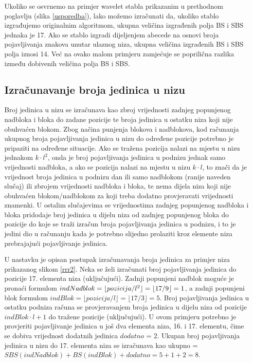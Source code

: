 Ukoliko se osvrnemo na primjer wavelet stabla prikazanim u prethodnom poglavlju (slika \ref{usporedba}), lako možemo izračunati da, ukoliko stablo izgrađujemo originalnim algoritmom, ukupna veličina izgrađenih polja BS i SBS jednaka je 17. Ako se stablo izgradi dijeljenjem abecede na osnovi broja pojavljivanja znakova unutar ulaznog niza, ukupna veličina izgrađenih BS i SBS polja iznosi 14. Već na ovako malom primjeru zamjećuje se poprilična razlika između dobivenih veličina polja BS i SBS.


\subsection{Izračunavanje broja jedinica u nizu}
Broj jedinica u nizu se izračunava kao zbroj vrijednosti zadnjeg popunjenog nadbloka i bloka do zadane pozicije te broja jedinica u ostatku niza koji nije obuhvaćen blokom. Zbog načina punjenja blokova i nadblokova, kod računanja ukupnog broja pojavljivanja jedinica u nizu do određene pozicije potrebno je pripaziti na određene situacije. Ako se tražena pozicija nalazi na mjestu u nizu jednakom $k\cdot l^2$, onda je broj pojavljivanja jedinica u podnizu jednak samo vrijednosti nadbloka, a ako se pozicija nalazi na mjestu u nizu $k\cdot l$, to znači da je vrijednost broja jedinica u podnizu dan ili samo nadblokom (ranije naveden slučaj) ili zbrojem vrijednosti nadbloka i bloka, te nema dijela niza koji nije obuhvaćen blokom/nadblokom za koji treba dodatno provjeravati vrijednosti znamenki. U ostalim slučajevima se vrijednostima zadnjeg popunjenog nadbloka i bloka pridodaje broj jedinica u dijelu niza od zadnjeg popunjenog bloka do pozicije do koje se traži izračun broja pojavljivanja jedinica u podnizu, i to je jedini dio u računanju kada je potrebno slijedno prolaziti kroz elemente niza prebrajajući pojavljivanje jedinica.

U nastavku je opisan postupak izračunavanja broja jedinica za primjer niza prikazanog slikom \ref{rrr2}. Neka se želi izračunati broj pojavljivanja jedinica do pozicije 17. elementa niza (uključujući). Zadnji popunjeni nadblok moguće je pronaći formulom $indNadblok = \linebreak \lfloor pozicija/l^2 \rfloor = \lfloor 17/9 \rfloor = 1$, a zadnji popunjeni blok formulom $indBlok = \lfloor pozicija/l \rfloor = \lfloor 17/3 \rfloor = 5$. Broj pojavljivanja jedinica u ostatku podniza računa se provjeravanjem broja jedinica u dijelu niza od pozicije $indBlok\cdot l+1$ do tražene pozicije (uključujući). U ovom primjeru potrebno je provjeriti pojavljivanje jedinica u još dva elementa niza, 16. i 17. elementu, čime se dobiva vrijednost dodatnih jedinica $dodatno$ = 2. Ukupan broj pojavljivanja jedinica u nizu do 17. elementa niza se izračunava kao ukupno  = $SBS(indNadblok) + BS(indBlok) + dodatno = 5 + 1 + 2 = 8$.

